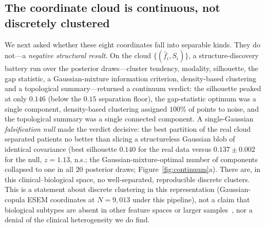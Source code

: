 \subsection{The coordinate cloud is continuous, not discretely clustered}

We next asked whether these eight coordinates fall into separable kinds. They do not---a
\emph{negative structural result}. On the cloud $\{(\hat f_i,S_i)\}$, a
structure-discovery battery run over the posterior
draws---cluster tendency, modality, silhouette, the gap statistic, a Gaussian-mixture
information criterion, density-based clustering and a topological summary---returned a
continuum verdict: the silhouette peaked at only $0.146$ (below the $0.15$ separation
floor), the gap-statistic optimum was a single component, density-based clustering
assigned $100\%$ of points to noise, and the topological summary
was a single connected component. A single-Gaussian \emph{falsification null} made the
verdict decisive: the best partition of the real cloud separated patients no better than
slicing a structureless Gaussian blob of identical covariance (best silhouette $0.140$
for the real data versus $0.137\pm0.002$ for the null, $z=1.13$, n.s.; the
Gaussian-mixture-optimal number of components collapsed to one in all $20$ posterior
draws; Figure~\ref{fig:continuum}a). There are, in this clinical--biological space, no
well-separated, reproducible discrete clusters. This is a statement about discrete clustering
in this representation (Gaussian-copula ESEM coordinates at $N=9{,}013$ under this pipeline),
not a claim that biological subtypes are absent in other feature spaces or larger
samples~\citep{marquand2016,parker2025,haslam2012}, nor a denial of the clinical heterogeneity
we do find.


